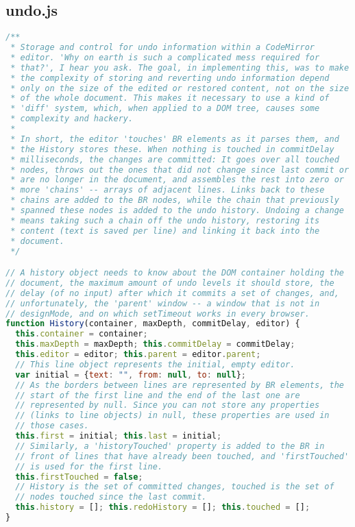 \subsection{undo.js}
\begin{lstlisting}[language=Javascript]
/**
 * Storage and control for undo information within a CodeMirror
 * editor. 'Why on earth is such a complicated mess required for
 * that?', I hear you ask. The goal, in implementing this, was to make
 * the complexity of storing and reverting undo information depend
 * only on the size of the edited or restored content, not on the size
 * of the whole document. This makes it necessary to use a kind of
 * 'diff' system, which, when applied to a DOM tree, causes some
 * complexity and hackery.
 *
 * In short, the editor 'touches' BR elements as it parses them, and
 * the History stores these. When nothing is touched in commitDelay
 * milliseconds, the changes are committed: It goes over all touched
 * nodes, throws out the ones that did not change since last commit or
 * are no longer in the document, and assembles the rest into zero or
 * more 'chains' -- arrays of adjacent lines. Links back to these
 * chains are added to the BR nodes, while the chain that previously
 * spanned these nodes is added to the undo history. Undoing a change
 * means taking such a chain off the undo history, restoring its
 * content (text is saved per line) and linking it back into the
 * document.
 */

// A history object needs to know about the DOM container holding the
// document, the maximum amount of undo levels it should store, the
// delay (of no input) after which it commits a set of changes, and,
// unfortunately, the 'parent' window -- a window that is not in
// designMode, and on which setTimeout works in every browser.
function History(container, maxDepth, commitDelay, editor) {
  this.container = container;
  this.maxDepth = maxDepth; this.commitDelay = commitDelay;
  this.editor = editor; this.parent = editor.parent;
  // This line object represents the initial, empty editor.
  var initial = {text: "", from: null, to: null};
  // As the borders between lines are represented by BR elements, the
  // start of the first line and the end of the last one are
  // represented by null. Since you can not store any properties
  // (links to line objects) in null, these properties are used in
  // those cases.
  this.first = initial; this.last = initial;
  // Similarly, a 'historyTouched' property is added to the BR in
  // front of lines that have already been touched, and 'firstTouched'
  // is used for the first line.
  this.firstTouched = false;
  // History is the set of committed changes, touched is the set of
  // nodes touched since the last commit.
  this.history = []; this.redoHistory = []; this.touched = [];
}


\end{lstlisting}
